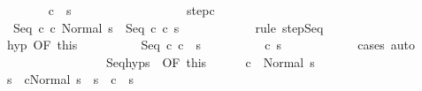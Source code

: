 \begin{isabellebody}
\ \ \ \ \ \ \isamarkupfalse%
\ {\isachardoublequoteopen}{\isasymGamma}{\isasymturnstile}c{\isacharprime}\ {\isasymdown}\ s{\isacharprime}{\isachardoublequoteclose}\isanewline
\ \ \ \ \ \ \isamarkupfalse%
\ {\isacharminus}\isanewline
\ \ \ \ \ \ \ \ \isamarkupfalse%
\ step{\isacharunderscore}c\isanewline
\ \ \ \ \ \ \ \ \isamarkupfalse%
\ {\isachardoublequoteopen}{\isasymGamma}{\isasymturnstile}\ {\isacharparenleft}Seq\ c\ c\ Normal\ s{\isacharparenright}\ {\isasymrightarrow}\ {\isacharparenleft}Seq\ c{\isacharprime}\ c\ s{\isacharprime}{\isacharparenright}{\isachardoublequoteclose}\isanewline
\ \ \ \ \ \ \ \ \ \ \isamarkupfalse%
\ {\isacharparenleft}rule\ step{\isachardot}Seq{\isacharparenright}\isanewline
\ \ \ \ \ \ \ \ \isamarkupfalse%
\ hyp\ {\isacharbrackleft}OF\ this{\isacharbrackright}\isanewline
\ \ \ \ \ \ \ \ \isamarkupfalse%
\ {\isachardoublequoteopen}{\isasymGamma}{\isasymturnstile}Seq\ c{\isacharprime}\ c\ {\isasymdown}\ s{\isacharprime}{\isachardoublequoteclose}\isacommand{{\isachardot}}\isamarkupfalse%
\isanewline
\ \ \ \ \ \ \ \ \isamarkupfalse%
\ {\isachardoublequoteopen}{\isasymGamma}{\isasymturnstile}c{\isacharprime}{\isasymdown}\ s{\isacharprime}{\isachardoublequoteclose}\isanewline
\ \ \ \ \ \ \ \ \ \ \isamarkupfalse%
\ cases\ auto\isanewline
\ \ \ \ \ \ \isamarkupfalse%
\isanewline
\ \ \ \ \isacommand{{\isacharbraceright}}\isamarkupfalse%
\isanewline
\ \ \ \ \isamarkupfalse%
\ Seq{\isachardot}hyps\ {\isacharparenleft}{}{\isacharparenright}\ {\isacharbrackleft}OF\ this{\isacharbrackright}\isanewline
\ \ \ \ \isamarkupfalse%
\ {\isachardoublequoteopen}{\isasymGamma}{\isasymturnstile}c\ {\isasymdown}\ Normal\ s{\isachardoublequoteclose}\isacommand{{\isachardot}}\isamarkupfalse%
\isanewline
\ \ \isamarkupfalse%
\isanewline
\ \ \ \ \isamarkupfalse%
\ {\isachardoublequoteopen}{\isasymforall}s{\isacharprime}{\isachardot}\ {\isasymGamma}{\isasymturnstile}\ {\isasymlangle}cNormal\ s{\isasymrangle}\ {\isasymRightarrow}\ s{\isacharprime}\ {\isasymlongrightarrow}\ {\isasymGamma}{\isasymturnstile}c\ {\isasymdown}\ s{\isacharprime}{\isachardoublequoteclose}\isanewline

\end{isabellebody}
